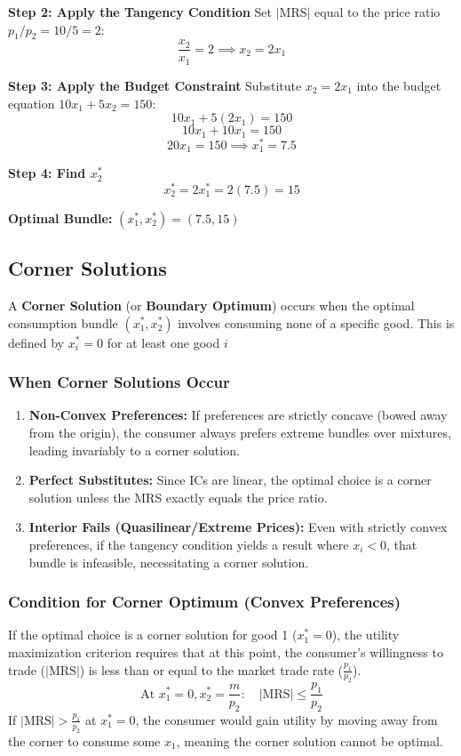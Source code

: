 \documentclass{article}
\begin{document}
\textbf{Step 2: Apply the Tangency Condition}
Set $|\text{MRS}|$ equal to the price ratio $p_1/p_2 = 10/5 = 2$:
\[ \frac{x_2}{x_1} = 2 \implies x_2 = 2x_1 \]

\textbf{Step 3: Apply the Budget Constraint}
Substitute $x_2 = 2x_1$ into the budget equation $10x_1 + 5x_2 = 150$:
\[ 10x_1 + 5(2x_1) = 150 \]
\[ 10x_1 + 10x_1 = 150 \]
\[ 20x_1 = 150 \implies x_1^* = 7.5 \]

\textbf{Step 4: Find $x_2^*$}
\[ x_2^* = 2x_1^* = 2(7.5) = 15 \]

\textbf{Optimal Bundle:} $(x_1^*, x_2^*) = (7.5, 15)$

\subsection{Corner Solutions}

A \textbf{Corner Solution} (or \textbf{Boundary Optimum}) occurs when the optimal consumption bundle $(x_1^*, x_2^*)$ involves consuming none of a specific good. This is defined by $x_i^* = 0$ for at least one good $i$

\subsubsection*{When Corner Solutions Occur}

\begin{enumerate}
    \item \textbf{Non-Convex Preferences:} If preferences are strictly concave (bowed away from the origin), the consumer always prefers extreme bundles over mixtures, leading invariably to a corner solution.
    \item \textbf{Perfect Substitutes:} Since ICs are linear, the optimal choice is a corner solution unless the MRS exactly equals the price ratio.
    \item \textbf{Interior Fails (Quasilinear/Extreme Prices):} Even with strictly convex preferences, if the tangency condition yields a result where $x_i < 0$, that bundle is infeasible, necessitating a corner solution.
\end{enumerate}

\subsubsection*{Condition for Corner Optimum (Convex Preferences)}

If the optimal choice is a corner solution for good 1 ($x_1^*=0$), the utility maximization criterion requires that at this point, the consumer's willingness to trade ($|\text{MRS}|$) is less than or equal to the market trade rate ($\frac{p_1}{p_2}$).
\[ \text{At } x_1^* =0, x_2^*=\frac{m}{p_2}: \quad |\text{MRS}| \leq \frac{p_1}{p_2} \]
If $|\text{MRS}| > \frac{p_1}{p_2}$ at $x_1^*=0$, the consumer would gain utility by moving away from the corner to consume some $x_1$, meaning the corner solution cannot be optimal.
\end{document}
